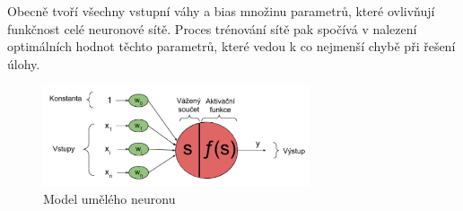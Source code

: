 




Obecně tvoří všechny vstupní váhy a bias množinu parametrů, které ovlivňují
funkčnost celé neuronové sítě. Proces trénování sítě pak spočívá v nalezení
optimálních hodnot těchto parametrů, které vedou k co nejmenší chybě při řešení
úlohy.

\begin{figure}[]
    \centering
    \includegraphics[width=0.7\textwidth]{Figures/neuron.png}
    \caption{Model umělého neuronu \cite{lagan}}
    \label{fig:neuron}
\end{figure}





